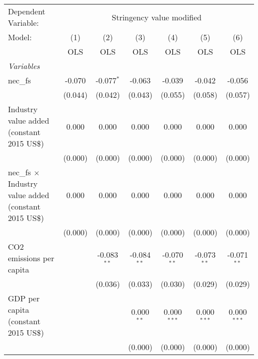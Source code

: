 
\begingroup
\centering
\begin{tabular}{lcccccc}
   \toprule
   Dependent Variable: & \multicolumn{6}{c}{Stringency value modified}\\
   Model:                                                        & (1)     & (2)           & (3)           & (4)            & (5)            & (6)\\  
                                                                 &  OLS    & OLS           & OLS           & OLS            & OLS            & OLS\\  
   \midrule
   \emph{Variables}\\
   nec\_fs                                                       & -0.070  & -0.077$^{*}$  & -0.063        & -0.039         & -0.042         & -0.056\\   
                                                                 & (0.044) & (0.042)       & (0.043)       & (0.055)        & (0.058)        & (0.057)\\   
   Industry value added (constant 2015 US\$)                     & 0.000   & 0.000         & 0.000         & 0.000          & 0.000          & 0.000\\   
                                                                 & (0.000) & (0.000)       & (0.000)       & (0.000)        & (0.000)        & (0.000)\\   
   nec\_fs $\times$ Industry value added (constant 2015 US\$)    & 0.000   & 0.000         & 0.000         & 0.000          & 0.000          & 0.000\\   
                                                                 & (0.000) & (0.000)       & (0.000)       & (0.000)        & (0.000)        & (0.000)\\   
   CO2 emissions per capita                                      &         & -0.083$^{**}$ & -0.084$^{**}$ & -0.070$^{**}$  & -0.073$^{**}$  & -0.071$^{**}$\\   
                                                                 &         & (0.036)       & (0.033)       & (0.030)        & (0.029)        & (0.029)\\   
   GDP per capita (constant 2015 US\$)                           &         &               & 0.000$^{**}$  & 0.000$^{***}$  & 0.000$^{***}$  & 0.000$^{***}$\\   
                                                                 &         &               & (0.000)       & (0.000)        & (0.000)        & (0.000)\\   

\end{tabular}
